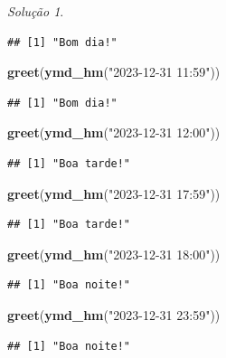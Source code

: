 \documentclass[
]{latex/krantz}
\newenvironment{Shaded}{\begin{snugshade}}{\end{snugshade}}
\newcommand{\FunctionTok}[1]{\textcolor[rgb]{0.13,0.29,0.53}{\textbf{#1}}}
\newcommand{\NormalTok}[1]{#1}
\newcommand{\StringTok}[1]{\textcolor[rgb]{0.31,0.60,0.02}{#1}}
\theoremstyle{definition}
\theoremstyle{definition}
\theoremstyle{definition}
\theoremstyle{definition}
\theoremstyle{remark}
\newtheorem*{solution}{Solução}
\begin{document}
\begin{solution}
\begin{verbatim}
## [1] "Bom dia!"
\end{verbatim}

\begin{Shaded}
\begin{Highlighting}[]
\FunctionTok{greet}\NormalTok{(}\FunctionTok{ymd\_hm}\NormalTok{(}\StringTok{"2023{-}12{-}31 11:59"}\NormalTok{))}
\end{Highlighting}
\end{Shaded}

\begin{verbatim}
## [1] "Bom dia!"
\end{verbatim}

\begin{Shaded}
\begin{Highlighting}[]
\FunctionTok{greet}\NormalTok{(}\FunctionTok{ymd\_hm}\NormalTok{(}\StringTok{"2023{-}12{-}31 12:00"}\NormalTok{))}
\end{Highlighting}
\end{Shaded}

\begin{verbatim}
## [1] "Boa tarde!"
\end{verbatim}

\begin{Shaded}
\begin{Highlighting}[]
\FunctionTok{greet}\NormalTok{(}\FunctionTok{ymd\_hm}\NormalTok{(}\StringTok{"2023{-}12{-}31 17:59"}\NormalTok{))}
\end{Highlighting}
\end{Shaded}

\begin{verbatim}
## [1] "Boa tarde!"
\end{verbatim}

\begin{Shaded}
\begin{Highlighting}[]
\FunctionTok{greet}\NormalTok{(}\FunctionTok{ymd\_hm}\NormalTok{(}\StringTok{"2023{-}12{-}31 18:00"}\NormalTok{))}
\end{Highlighting}
\end{Shaded}

\begin{verbatim}
## [1] "Boa noite!"
\end{verbatim}

\begin{Shaded}
\begin{Highlighting}[]
\FunctionTok{greet}\NormalTok{(}\FunctionTok{ymd\_hm}\NormalTok{(}\StringTok{"2023{-}12{-}31 23:59"}\NormalTok{))}
\end{Highlighting}
\end{Shaded}

\begin{verbatim}
## [1] "Boa noite!"
\end{verbatim}

\end{solution}
\end{document}
